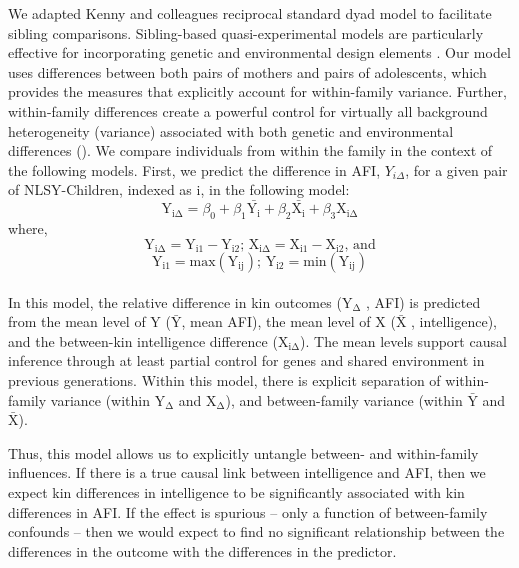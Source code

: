 We adapted Kenny and colleagues \citeyearpar{kenny2001social,kenny2006dyadic} reciprocal standard dyad model to facilitate sibling comparisons. Sibling-based quasi-experimental models are particularly effective for incorporating genetic and environmental design elements \citep{Lahey2010,Rutter2007}. Our model uses differences between both pairs of mothers and pairs of adolescents, which provides the measures that explicitly account for within-family variance. Further, within-family differences create a powerful control for virtually all background heterogeneity (variance) associated with both genetic and environmental differences (\citeauthor{Lahey2010}). We compare individuals from within the family in the context of the following models. First, we predict the difference in AFI, $Y_{i\Delta}$, for a given pair of NLSY-Children, indexed as i, in the following model:
\begin{equation}\label{equation_discord_main}
\mathrm{Y_{i\Delta}} = \beta_0 + \beta_1\mathrm{\bar{Y_{i}}} + \beta_2\mathrm{\bar{X_{i}}} + \beta_3\mathrm{X_{i\Delta}}
\end{equation}\vspace{-10pt}
where,
\begin{equation}\label{equation_discord_defs_delta}
\mathrm{Y_{i\Delta}} = \mathrm{Y_{i1}} - \mathrm{Y_{i2}};\, \mathrm{X_{i\Delta}} = \mathrm{X_{i1}} - \mathrm{X_{i2}},\, \mathrm{and}
\end{equation}
\begin{equation}\label{equation_discord_defs_min}
\mathrm{Y_{i1}} = \mathrm{max}(\mathrm{Y_{ij}});\, \mathrm{Y_{i2}} = \mathrm{min}(\mathrm{Y_{ij}})
\end{equation}\\

In this model, the relative difference in kin outcomes ($\mathrm{Y_{\Delta}}$ \eg, AFI) is predicted from the mean level of Y ($\mathrm{\bar{Y}}$, \eg mean AFI), the mean level of X ($\mathrm{\bar{X}}$ \eg, intelligence), and the between-kin intelligence difference ($\mathrm{X_{i\Delta}}$). The mean levels support causal inference through at least partial control for genes and shared environment in previous generations. Within this model, there is explicit separation of within-family variance (within $\mathrm{Y_{\Delta}}$ and $\mathrm{X_{\Delta}}$), and between-family variance (within $\mathrm{\bar{Y}}$ and $\mathrm{\bar{X}}$).

Thus, this model allows us to explicitly untangle between- and within-family influences. If there is a true causal link between intelligence and AFI, then we expect kin differences in intelligence to be significantly associated with kin differences in AFI. If the effect is spurious -- only a function of between-family confounds -- then we would expect to find no significant relationship between the differences in the outcome with the differences in the predictor.